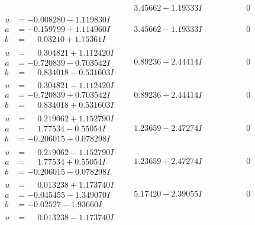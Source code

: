 \documentclass[1p]{elsarticle_modified}
\theoremstyle{definition}
\begin{document}
$$\begin{array}{c|c|c}
 & \phantom{-}3.45662 + 1.19333 I & \phantom{-0.000000 } 0 \\ \hline\begin{aligned}
u &= -0.008280 - 1.119830 I \\
a &= -0.159799 + 1.114960 I \\
b &= \phantom{-}0.03210 + 1.75361 I\end{aligned}
 & \phantom{-}3.45662 - 1.19333 I & \phantom{-0.000000 } 0 \\ \hline\begin{aligned}
u &= \phantom{-}0.304821 + 1.112420 I \\
a &= -0.720839 - 0.703542 I \\
b &= \phantom{-}0.834018 - 0.531603 I\end{aligned}
 & \phantom{-}0.89236 - 2.44414 I & \phantom{-0.000000 } 0 \\ \hline\begin{aligned}
u &= \phantom{-}0.304821 - 1.112420 I \\
a &= -0.720839 + 0.703542 I \\
b &= \phantom{-}0.834018 + 0.531603 I\end{aligned}
 & \phantom{-}0.89236 + 2.44414 I & \phantom{-0.000000 } 0 \\ \hline\begin{aligned}
u &= \phantom{-}0.219062 + 1.152790 I \\
a &= \phantom{-}1.77534 - 0.55054 I \\
b &= -0.206015 + 0.078298 I\end{aligned}
 & \phantom{-}1.23659 - 2.47274 I & \phantom{-0.000000 } 0 \\ \hline\begin{aligned}
u &= \phantom{-}0.219062 - 1.152790 I \\
a &= \phantom{-}1.77534 + 0.55054 I \\
b &= -0.206015 - 0.078298 I\end{aligned}
 & \phantom{-}1.23659 + 2.47274 I & \phantom{-0.000000 } 0 \\ \hline\begin{aligned}
u &= \phantom{-}0.013238 + 1.173740 I \\
a &= -0.045455 - 1.349070 I \\
b &= -0.02527 - 1.93660 I\end{aligned}
 & \phantom{-}5.17420 - 2.39055 I & \phantom{-0.000000 } 0 \\ \hline\begin{aligned}
u &= \phantom{-}0.013238 - 1.173740 I \\

\end{aligned}
\end{array}$$
\end{document}
